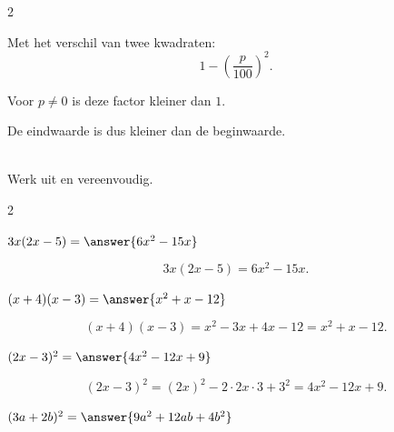 \documentclass{ximera}
\begin{document}
\begin{oefening}{\oefU\ESS}
\begin{multicols}{2}
\begin{question}
\begin{oplossing}
    Met het verschil van twee kwadraten:
    \[
    1-\left(\dfrac{p}{100}\right)^2.
    \]
    
    Voor $p\neq0$ is deze factor kleiner dan $1$.
    
    De eindwaarde is dus kleiner dan de beginwaarde.
    \end{oplossing}
    \end{question}
    
    \end{multicols}
    
    \end{oefening}




\begin{oefening}[Uitwerken]{\oefB\ESS}
    \\
    
    Werk uit en vereenvoudig.
    
    \begin{multicols}{2}
    
    \begin{question}
    $3x(2x-5)=\answer{6x^2-15x}$
    
    \begin{oplossing}
    \[
    3x(2x-5)=6x^2-15x.
    \]
    \end{oplossing}
    \end{question}
    
    
    \begin{question}
    $(x+4)(x-3)=\answer{x^2+x-12}$
    
    \begin{oplossing}
    \[
    (x+4)(x-3)
    =x^2-3x+4x-12
    =x^2+x-12.
    \]
    \end{oplossing}
    \end{question}
    
    
    \begin{question}
    $(2x-3)^2=\answer{4x^2-12x+9}$
    
    \begin{oplossing}
    \[
    (2x-3)^2
    =(2x)^2-2\cdot2x\cdot3+3^2
    =4x^2-12x+9.
    \]
    \end{oplossing}
    \end{question}
    
    
    \begin{question}
    $(3a+2b)^2=\answer{9a^2+12ab+4b^2}$
    

\end{question}
\end{multicols}
\end{oefening}
\end{document}
